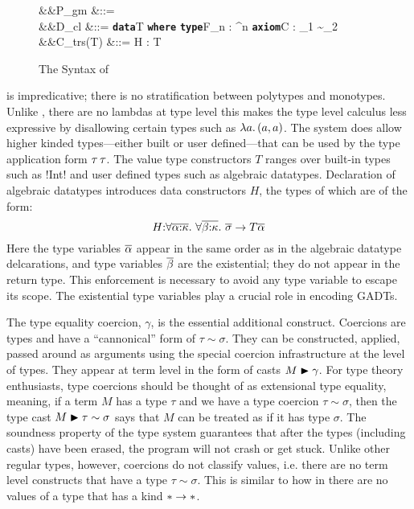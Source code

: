 \documentclass[manuscript,screen,nonacm]{acmart}
\begin{document}
\begin{figure}[ht]
  \begin{syntax}
     &&P_{gm} &::=  \mathrel{;} \many{\Tm}\\
     &&D_{cl} &::= \textbf{\texttt{data}}\App T\co\many{\kappa} \to \star\App \textbf{\texttt{where}}\App {} \mid \textbf{\texttt{type}}\App F_n : \many\kappa^n \to \kappa \mid  \textbf{\texttt{axiom}}\App C\App \many{\alpha\co\kappa} : \sigma_1 \sim \sigma_2 \\
     &&C_{trs}(T) &::= H : \Forall {\many{\alpha\co\kappa}} { \many{(\tau \sim \tau)} \then \many\sigma \to T\many\alpha}
  \end{syntax}
  
  \caption{The Syntax of \SFC}
  \label{fig:system-fc-syntax}
\end{figure}

\SFC is impredicative; there is no stratification between polytypes and monotypes. Unlike \SFw, there are no lambdas at type level this makes the type level calculus less expressive by disallowing certain types such as $\lambda a.\, (a, a)$. The system does allow higher kinded types---either built or user defined---that can be used by the type application form $\tau\,\tau$.  The value type constructors $T$ ranges over built-in types such as !Int! and user defined types such as algebraic datatypes. Declaration of algebraic datatypes introduces data constructors $H$, the types of which are of the form:
$$
H {:} \forall\overline{\alpha{:}\kappa}.~\forall\overline{\beta{:}\kappa}.~\overline{\sigma} \to T \overline{\alpha}
$$
Here the type variables $\overline{\alpha}$ appear in the same order as in the algebraic datatype delcarations,  and type variables $\overline{\beta}$ are the existential; they do not appear in the return type. This enforcement is necessary to avoid any type variable to escape its scope. The existential type variables play a crucial role in encoding GADTs. 

The type equality coercion, $\gamma$, is the essential additional construct. Coercions are types and have a ``cannonical'' form of $\tau\sim\sigma$. They can be constructed, applied, passed around as arguments using the special coercion infrastructure at the level of types. They appear at term level in the form of casts $M\mathrel{\blacktriangleright}\gamma$. For type theory enthusiasts, type coercions should be thought of as extensional type equality, meaning, if a term $M$ has a type $\tau$ and we have a type coercion $\tau\sim\sigma$, then the type cast $M\mathrel{\blacktriangleright}\tau\sim\sigma$ says that $M$ can be treated as if it has type $\sigma$. The soundness property of the type system guarantees that after the types (including casts) have been erased, the program will not crash or get stuck. Unlike other regular types, however, coercions do not classify values, i.e. there are no term level constructs that have a type $\tau\sim\sigma$. This is similar to how in \SFw there are no values of a type that has a kind $\ast\to\ast$.
\end{document}
